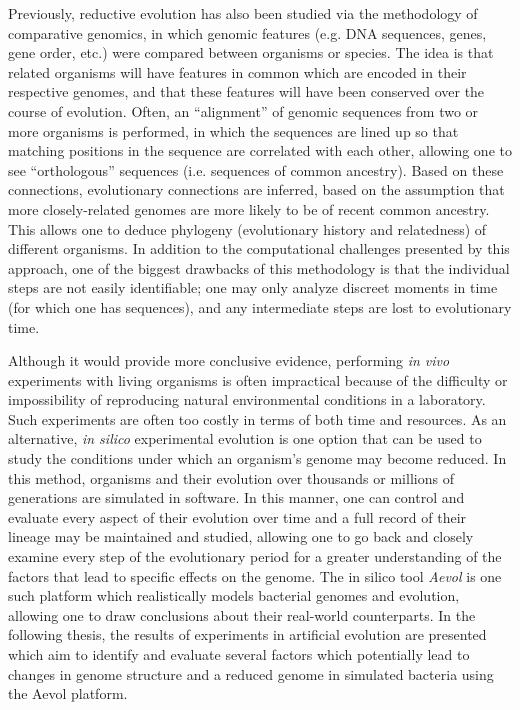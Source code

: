 Previously, reductive evolution has also been studied via the methodology of comparative genomics, in which genomic features (e.g. DNA sequences, genes, gene order, etc.) were compared between organisms or species. The idea is that related organisms will have features in common which are encoded in their respective genomes, and that these features will have been conserved over the course of evolution. Often, an ``alignment'' of genomic sequences from two or more organisms is performed, in which the sequences are lined up so that matching positions in the sequence are correlated with each other, allowing one to see ``orthologous'' sequences (i.e. sequences of common ancestry). Based on these connections, evolutionary connections are inferred, based on the assumption that more closely-related genomes are more likely to be of recent common ancestry. This allows one to deduce phylogeny (evolutionary history and relatedness) of different organisms. In addition to the computational challenges presented by this approach, one of the biggest drawbacks of this methodology is that the individual steps are not easily identifiable; one may only analyze discreet moments in time (for which one has sequences), and any intermediate steps are lost to evolutionary time.  

Although it would provide more conclusive evidence, performing \textit{in vivo} experiments with living organisms is often impractical because of the difficulty or impossibility of reproducing natural environmental conditions in a laboratory. Such experiments are often too costly in terms of both time and resources. As an alternative, \textit{in silico} experimental evolution is one option that can be used to study the conditions under which an organism's genome may become reduced. In this method, organisms and their evolution over thousands or millions of generations are simulated in software. In this manner, one can control and evaluate every aspect of their evolution over time and a full record of their lineage may be maintained and studied, allowing one to go back and closely examine every step of the evolutionary period for a greater understanding of the factors that lead to specific effects on the genome. The in silico tool \textit{Aevol} is one such platform which realistically models bacterial genomes and evolution, allowing one to draw conclusions about their real-world counterparts. In the following thesis, the results of experiments in artificial evolution are presented which aim to identify and evaluate several factors which potentially lead to changes in genome structure and a reduced genome in simulated bacteria using the Aevol platform. 


